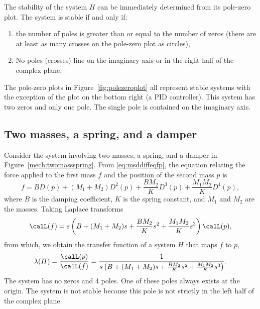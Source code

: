 \documentclass[11pt,a4paper]{book}
\theoremstyle{plain}
\numberwithin{equation}{section}
\begin{document}
The stability of the system $H$ can be immediately determined from its pole-zero plot.  The system is stable if and only if: 
\begin{enumerate}
\item the number of poles is greater than or equal to the number of zeros (there are at least as many crosses on the pole-zero plot as circles), 
\item No poles (crosses) line on the imaginary axis or in the right half of the complex plane.
\end{enumerate}
The pole-zero plots in Figure~\ref{fig:polezeroplot} all represent stable systems with the exception of the plot on the bottom right (a PID controller).  This system has two zeros and only one pole.  The single pole is contained on the imaginary axis.  %


\subsection{Two masses, a spring, and a damper}

Consider the system involving two masses, a spring, and a damper in Figure~\ref{mech:twomassspring}.  From \eqref{eq:msddiffeqfp}, the equation relating the force applied to the first mass $f$ and the position of the second mass $p$ is
\[
f = B D(p) + (M_1+M_2) D^2(p) + \frac{B M_2}{K} D^3(p) + \frac{M_1 M_2}{K} D^4(p),
\]
where $B$ is the damping coefficient, $K$ is the spring constant, and $M_1$ and $M_2$ are the masses.  Taking Laplace transforms
\[
\calL(f) = s \left(B + (M_1+M_2) s + \frac{B M_2}{K} s^2 + \frac{M_1 M_2}{K} s^3 \right) \calL(p),
\]
from which, we obtain the transfer function of a system $H$ that maps $f$ to $p$,
\[
\lambda(H) = \frac{\calL(p)}{\calL(f)} = \frac{1}{s \left(B + (M_1+M_2) s + \frac{B M_2}{K} s^2 + \frac{M_1 M_2}{K} s^3 \right)}.
\]
The system has no zeros and 4 poles.  One of these poles always exists at the origin.  The system is not stable because this pole is not strictly in the left half of the complex plane.
\end{document}
